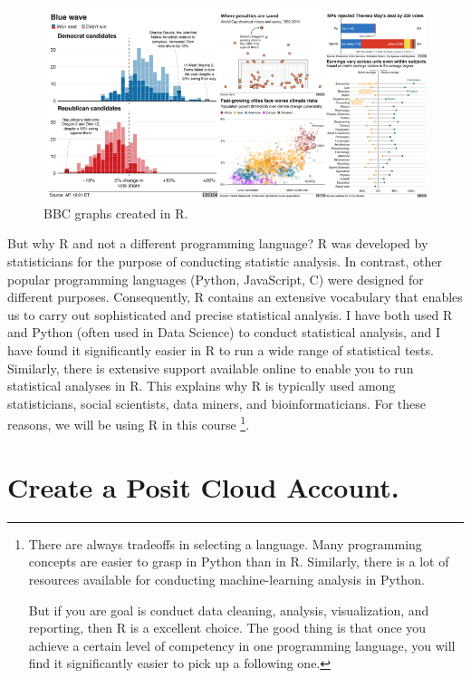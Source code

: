 \documentclass[
]{book}
\begin{document}
\begin{figure}
\centering
\includegraphics{img/01-bbc.png}
\caption{\label{fig:unnamed-chunk-1}BBC graphs created in R.}
\end{figure}

But why R and not a different programming language? R was developed by statisticians for the purpose of conducting statistic analysis. In contrast, other popular programming languages (Python, JavaScript, C) were designed for different purposes. Consequently, R contains an extensive vocabulary that enables us to carry out sophisticated and precise statistical analysis. I have both used R and Python (often used in Data Science) to conduct statistical analysis, and I have found it significantly easier in R to run a wide range of statistical tests. Similarly, there is extensive support available online to enable you to run statistical analyses in R. This explains why R is typically used among statisticians, social scientists, data miners, and bioinformaticians. For these reasons, we will be using R in this course \footnote{There are always tradeoffs in selecting a language. Many programming concepts are easier to grasp in Python than in R. Similarly, there is a lot of resources available for conducting machine-learning analysis in Python.

  But if you are goal is conduct data cleaning, analysis, visualization, and reporting, then R is a excellent choice. The good thing is that once you achieve a certain level of competency in one programming language, you will find it significantly easier to pick up a following one.}.

\section{Create a Posit Cloud Account.}\label{create-a-posit-cloud-account.}
\end{document}
